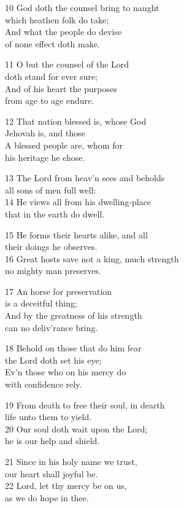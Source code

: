 10 God doth the counsel bring to naught\\
which heathen folk do take;\\
And what the people do devise\\
of none effect doth make.

11 O but the counsel of the Lord\\
doth stand for ever sure;\\
And of his heart the purposes\\
from age to age endure.

12 That nation blessed is, whose God\\
Jehovah is, and those\\
A blessed people are, whom for\\
his heritage he chose.

13 The Lord from heav’n sees and beholds\\
all sons of men full well:\\
14 He views all from his dwelling-place\\
that in the earth do dwell.

15 He forms their hearts alike, and all\\
their doings he observes.\\
16 Great hosts save not a king, much strength\\
no mighty man preserves.

17 An horse for preservation\\
is a deceitful thing;\\
And by the greatness of his strength\\
can no deliv’rance bring.

18 Behold on those that do him fear\\
the Lord doth set his eye;\\
Ev’n those who on his mercy do\\
with confidence rely.

19 From death to free their soul, in dearth\\
life unto them to yield.\\
20 Our soul doth wait upon the Lord;\\
he is our help and shield.

21 Since in his holy name we trust,\\
our heart shall joyful be.\\
22 Lord, let thy mercy be on us,\\
as we do hope in thee.

